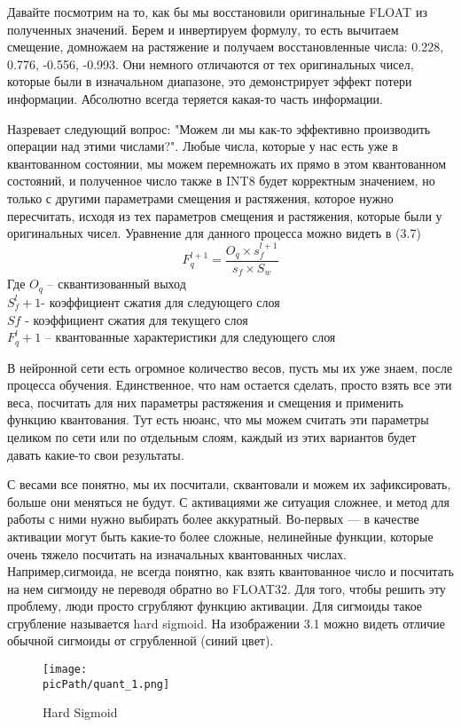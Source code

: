 \documentclass[oneside,final,12pt]{extreport}
\newcommand{\picPath}{images}
\begin{document}
Давайте посмотрим на то, как бы мы восстановили оригинальные FLOAT из полученных значений. Берем и инвертируем формулу, то есть вычитаем смещение, домножаем на растяжение и получаем восстановленные числа: 0.228, 0.776, -0.556, -0.993. Они немного отличаются от тех оригинальных чисел, которые были в изначальном диапазоне, это демонстрирует эффект потери информации. Абсолютно всегда теряется какая-то часть информации.

Назревает следующий вопрос: "Можем ли мы как-то эффективно производить операции над этими числами?". Любые числа, которые у нас есть уже в квантованном состоянии, мы можем перемножать их прямо в этом квантованном состояний, и полученное число также в INT8 будет корректным значением, но только с другими параметрами смещения и растяжения, которое нужно пересчитать, исходя из тех параметров смещения и растяжения, которые были у оригинальных чисел.  Уравнение для данного процесса можно видеть в  (3.7)
\begin{equation}
    F_q^{l+1}=\frac{O_q\times s_f^{l+1}}{s_f\times S_{w}}
\end{equation}
Где $O_q$ – сквантизованный выход\\
$S_f ^ l+1$- коэффициент сжатия для следующего слоя\\
$Sf$ -  коэффициент сжатия для текущего слоя\\
$F_q^l+1$ – квантованные характеристики для следующего слоя

В нейронной сети есть огромное количество весов, пусть мы их уже знаем, после процесса обучения. Единственное, что нам остается сделать, просто взять все эти веса, посчитать для них параметры растяжения и смещения и применить функцию квантования. Тут есть нюанс, что мы можем считать эти параметры целиком по сети или по отдельным слоям, каждый из этих вариантов будет давать какие-то свои результаты.

С весами все понятно, мы их посчитали, сквантовали и можем их зафиксировать, больше они меняться не будут. С активациями же ситуация сложнее, и метод для работы с ними нужно выбирать более аккуратный. Во-первых — в качестве активации могут быть какие-то более сложные, нелинейные функции, которые очень тяжело посчитать на изначальных квантованных числах. Например,сигмоида, не всегда понятно, как взять квантованное число и посчитать на нем сигмоиду не переводя обратно во FLOAT32. Для того, чтобы решить эту проблему, люди просто сгрубляют функцию активации. Для сигмоиды такое сгрубление называется hard sigmoid. На изображении 3.1 можно видеть отличие обычной сигмоиды от сгрубленной (синий цвет).
\begin{figure}[H]
\begin{center}
  \texttt{[image: \\picPath/quant\_1.png]}
  \caption{Hard Sigmoid}
  \label{fig:quant_1}
  \end{center}
\end{figure}
\end{document}
